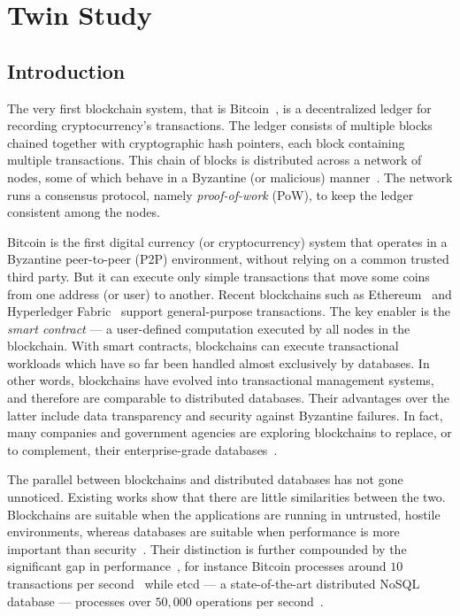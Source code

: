 \chapter{Twin Study}
\label{ch:twin}
\section{Introduction}
\label{sec:twin:intro}

The very first blockchain system, that is Bitcoin~\cite{nakamoto2019bitcoin}, is a decentralized ledger for
recording cryptocurrency's transactions. The ledger consists of multiple blocks chained together with cryptographic
hash pointers, each block containing multiple transactions. This chain of blocks is distributed    
across a network of nodes, some of which behave in a Byzantine (or malicious) manner~\cite{Lamport_BFT}. The network runs a
consensus protocol, namely \textit{proof-of-work} (PoW), to keep the ledger consistent among the nodes.  

Bitcoin is the first digital currency (or cryptocurrency) system that
operates in a Byzantine \cite{Lamport_BFT} peer-to-peer (P2P) environment, without relying on a common trusted
third party.
But it can execute only simple transactions that move some coins from one address (or user) to another.
Recent blockchains such as Ethereum~\cite{wood2014ethereum} and Hyperledger
Fabric~\cite{androulaki2018hyperledger} support general-purpose transactions. The key enabler is the {\em
smart contract} --- a user-defined computation executed by all nodes in the blockchain. 
With smart contracts, blockchains can execute transactional workloads which have so far been handled almost
exclusively by 
databases.  In other words, blockchains have evolved into transactional management systems, and therefore are
comparable to distributed databases. Their advantages over the latter include data transparency and security
against Byzantine failures. 
In fact, many companies and government agencies are exploring blockchains to replace, or to complement, their
enterprise-grade databases~\cite{mougayar2016business,morabito2017business,crosby2016blockchain}.

The parallel between blockchains and distributed databases has not gone
unnoticed. Existing works show that there are little similarities between the
two. Blockchains are suitable when the applications are running in untrusted,
hostile environments, whereas databases are suitable when performance is more
important than security~\cite{crosby2016blockchain,
wust2018you,chowdhury2018blockchain,yaga2018blockchain}. Their distinction is
further compounded by the significant gap in
performance~\cite{dinh2017blockbench}, for instance Bitcoin processes around
$10$ transactions per second~\cite{bitcoin_tps} while etcd --- a
state-of-the-art distributed NoSQL database --- processes over $50,000$
operations per second~\cite{etcd_perf}.


